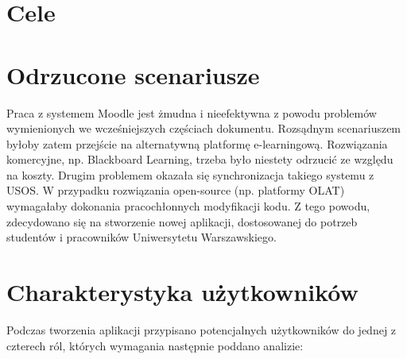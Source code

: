 \documentclass{pracamgr}
\begin{document}
\section{Cele}

%
%
\section{Odrzucone scenariusze} 

Praca z systemem Moodle jest żmudna i nieefektywna z powodu problemów 
wymienionych we wcześniejszych częściach dokumentu. Rozsądnym scenariuszem
byłoby zatem przejście na alternatywną platformę e-learningową. Rozwiązania 
komercyjne, np. Blackboard Learning, trzeba było niestety odrzucić ze względu
na koszty. Drugim problemem okazała się synchronizacja takiego systemu z
USOS. W przypadku rozwiązania open-source (np. platformy OLAT) wymagałaby
dokonania pracochłonnych modyfikacji kodu. Z tego powodu, zdecydowano się na 
stworzenie nowej aplikacji, dostosowanej do potrzeb studentów i pracowników 
Uniwersytetu Warszawskiego. 

%
%
\section{Charakterystyka użytkowników}

Podczas tworzenia aplikacji przypisano potencjalnych użytkowników
do jednej z czterech ról, których wymagania następnie poddano analizie:
\end{document}
